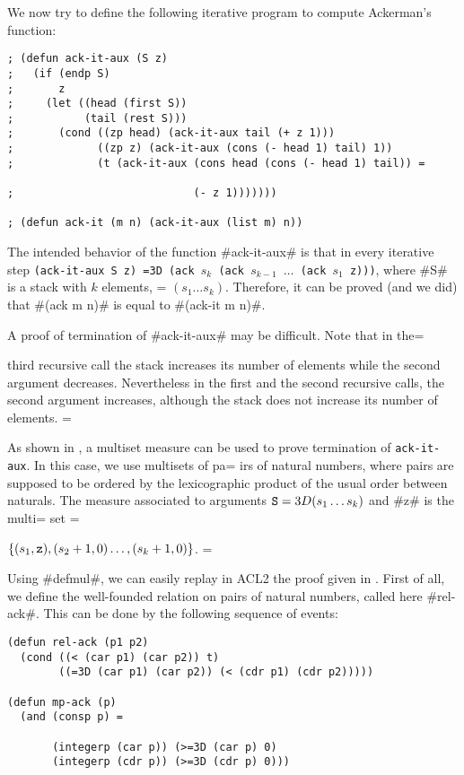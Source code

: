 \documentclass[11pt]{llncs}
\begin{document}
{We now try to define the following iterative program to compute
Ackerman's function:

\begin{verbatim}
; (defun ack-it-aux (S z)
;   (if (endp S)
;       z
;     (let ((head (first S))
;           (tail (rest S)))
;       (cond ((zp head) (ack-it-aux tail (+ z 1)))
;             ((zp z) (ack-it-aux (cons (- head 1) tail) 1))
;             (t (ack-it-aux (cons head (cons (- head 1) tail)) =

;                            (- z 1)))))))

; (defun ack-it (m n) (ack-it-aux (list m) n))
\end{verbatim}

The intended behavior of the function #ack-it-aux# is that in every
iterative step {\tt (ack-it-aux S z) =3D (ack $s_k$ (ack $s_{k-1}$
$\ldots$ (ack $s_1$ {\tt z})))}, where #S# is a stack with $k$ elements, =
$(s_1
\ldots s_k)$. Therefore, it can be proved (and we did) that #(ack m n)#
is equal to #(ack-it m n)#.

A proof of termination of #ack-it-aux# may be difficult. Note that in the=

third recursive call the stack increases its number of elements while
the second argument decreases. Nevertheless in the first and the second
recursive calls, the second argument increases, although the stack does
not increase its number of elements. =


As shown in \cite{DM-multiset}, a multiset measure can be used to prove
termination of {\tt ack\--it\--aux}. In this case, we use multisets of pa=
irs of
natural numbers, where pairs are supposed to be ordered by the
lexicographic product of the usual order between naturals. The measure
associated to arguments ${\tt S}=3D(s_1 \ldots s_k)$ and #z# is the multi=
set =

$\{(s_1,\mbox{{\tt z}}),(s_2+1,0)\ldots,(s_k+1,0)\}$.   =


Using #defmul#, we can easily replay in ACL2 the proof given in
\cite{DM-multiset}. First of all, we define the well-founded relation on
pairs of natural numbers, called here #rel-ack#. This can be done by the
following sequence of events:

\begin{verbatim}
(defun rel-ack (p1 p2)
  (cond ((< (car p1) (car p2)) t)
        ((=3D (car p1) (car p2)) (< (cdr p1) (cdr p2)))))

(defun mp-ack (p)
  (and (consp p) =

       (integerp (car p)) (>=3D (car p) 0)
       (integerp (cdr p)) (>=3D (cdr p) 0)))


\end{verbatim}}
\end{document}
